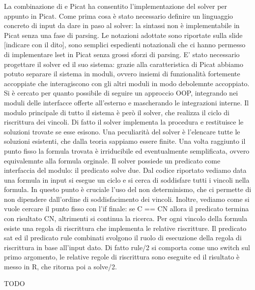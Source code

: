 \documentclass[11pt]{article}
\begin{document}
La combinazione di \lset{} e Picat ha consentito l'implementazione del
solver per \lset{} appunto in Picat. Come prima cosa è stato
necessario definire un linguaggio concreto di input da dare in paso al
solver: la sintassi \lset{} non è implementabile in Picat senza una
fase di parsing. Le notazioni adottate sono riportate sulla slide
[indicare con il dito], sono semplici espedienti notazionali che ci
hanno permesso di implementare lset in Picat senza grossi sforzi di
parsing. E' stato necessario progettare il solver ed il suo sistema:
grazie alla caratteristica di Picat abbiamo potuto separare il sistema
in moduli, ovvero insiemi di funzionalità fortemente accoppiate che
interagiscono con gli altri moduli in modo debolemnte accoppiato. Si è
cercato per quanto possibile di seguire un approccio OOP, integrando
nei moduli delle interfacce offerte all'esterno e mascherando le
integrazioni interne. Il modulo principale di tutto il sistema è però
il solver, che realizza il ciclo di riscrittura dei vincoli. Di fatto
il solver implementa la procedura \satset{} e restituisce le soluzioni
trovate se esse esisono. Una peculiarità del solver è l'elencare tutte
le soluzioni esistenti, che dalla teoria sappiamo essere finite. Una
volta raggiunto il punto fisso la formula trovata è irriducibile ed
eventualmente semplificata, ovvero equivalemnte alla formula
orginale. Il solver possiede un predicato come interfaccia del modulo:
il predicato solve due. Dal codice riportato vediamo data una formula
in input si esegue un ciclo e si cerca di soddisfare tutti i vincoli
nella formula. In questo punto è cruciale l'uso del non determinismo,
che ci permette di non dipendere dall'ordine di soddisfacimento dei
vincoli. Inoltre, vediamo come si vuole cercare il punto fisso con
l'if finale: se C == CN allora il predicato termina con risultato CN,
altrimenti si continua la ricerca. Per ogni vincolo della formula
esiste una regola di riscrittura che implementa le relative
riscritture. Il predicato sat ed il predicato rule combinati svolgono
il ruolo di esecuzione della regola di riscrittura in base all'input
dato. Di fatto rule/2 si comporta come uno switch sul primo argomento,
le relative regole di riscrittura sono eseguite ed il risultato è
messo in R, che ritorna poi a solve/2.

TODO
\end{document}
